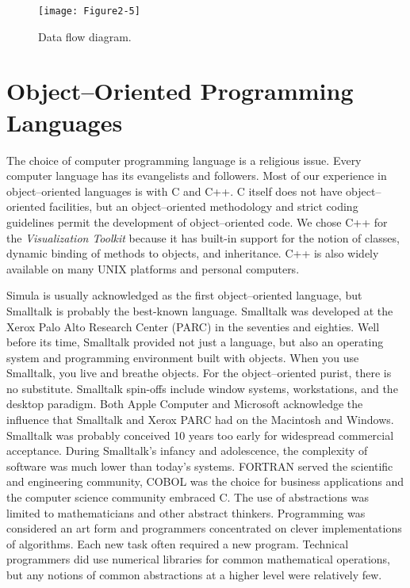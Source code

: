 \begin{figure}[!htb]
	\centering
	\texttt{[image: Figure2-5]}
	\caption{Data flow diagram.}
	\label{fig:Figure2-5}
\end{figure}

\section{Object--Oriented Programming Languages}

The choice of computer programming language is a religious issue. Every computer language has its evangelists and followers. Most of our experience in object--oriented languages is with C and C++. C itself does not have object--oriented facilities, but an object--oriented methodology and strict coding guidelines permit the development of object--oriented code. We chose C++ for the \emph{Visualization Toolkit} because it has built-in support for the notion of classes, dynamic binding of methods to objects, and inheritance. C++ is also widely available on many UNIX platforms and personal computers.

Simula \cite{Birtwistle79} is usually acknowledged as the first object--oriented language, but Smalltalk \cite{Goldberg83} is probably the best-known language. Smalltalk was developed at the Xerox Palo Alto Research Center (PARC) in the seventies and eighties. Well before its time, Smalltalk provided not just a language, but also an operating system and programming environment built with objects. When you use Smalltalk, you live and breathe objects. For the object--oriented purist, there is no substitute. Smalltalk spin-offs include window systems, workstations, and the desktop paradigm. Both Apple Computer and Microsoft acknowledge the influence that Smalltalk and Xerox PARC had on the Macintosh and Windows. Smalltalk was probably conceived 10 years too early for widespread commercial acceptance. During Smalltalk's infancy and adolescence, the complexity of software was much lower than today's systems. FORTRAN served the scientific and engineering community, COBOL was the choice for business applications and the computer science community embraced C. The use of abstractions was limited to mathematicians and other abstract thinkers. Programming was considered an art form and programmers concentrated on clever implementations of algorithms. Each new task often required a new program. Technical programmers did use numerical libraries for common mathematical operations, but any notions of common abstractions at a higher level were relatively few.

